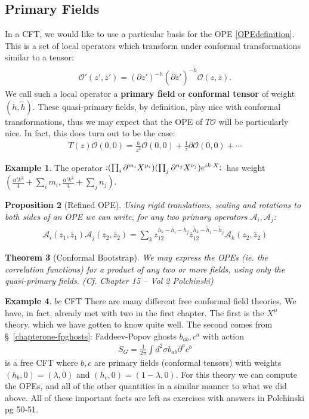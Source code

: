 \documentclass{report}
\theoremstyle{plain}
\newtheorem{theorem}{Theorem}[section]
\newtheorem{proposition}[theorem]{Proposition}
\theoremstyle{definition}
\newtheorem{example}[theorem]{Example}
\theoremstyle{remark}
\newcommand{\FR}[2]{\frac{#1}{#2}}
\newcommand{\ms}{\mathscr}
\newcommand{\lam}{\lambda}
\newcommand{\sg}{\sigma}
\newcommand{\di}{\partial}
\newcommand{\NO}[1]{\vcentcolon\mathrel{#1}\vcentcolon\,}
\begin{document}
\subsection{Primary Fields}
In a CFT, we would like to use a particular basis for the OPE
\eqref{OPEdefinition}. This is a set of local operators which transform
under conformal transformations similar to a tensor:
\begin{align}
    \ms O'(z',\bar z') = (\di z')^{-h}(\bar\di \bar z')^{-\tilde h} \ms
    O(z,\bar z).
    \label{primaryfielddefinition}
\end{align}
We call such a local operator a \textbf{primary field} or \textbf{conformal
tensor} of weight $(h,\tilde h)$. These quasi-primary fields, by
definition, play nice with conformal transformations, thus we may expect
that the OPE of $T\ms O$ will be particularly nice. In fact, this does turn
out to be the case:
\begin{align}
T(z)\ms O(0,0) = \FR{h}{z^2}\ms O(0,0) + \FR{1}{z}\di\ms O(0,0)+\cdots
\end{align}

\begin{example} The operator $\NO{(\prod_i\di^{m_i}X^{\mu_i})
(\prod_j\di^{n_j}X^{\nu_j})e^{ik\cdot X}}$ has weight $\left(
\FR{\alpha'k^2}{4} + \sum_i m_i, \FR{\alpha'k^2}{4} + \sum_j n_j \right)$.
\end{example}

\begin{proposition}[Refined OPE] Using rigid translations, scaling and
rotations to both sides of an OPE we can write, for any two primary
operators $\ms A_i, \ms A_j$:
\begin{align}
    \ms A_i(z_1,\bar z_1)\ms A_j(z_2,\bar z_2) = \sum_k
    z_{12}^{h_k-h_i-h_j}\bar z_{12}^{\tilde h_k-\tilde h_i-\tilde h_j}
    \ms A_k(z_2,\bar z_2)
    \label{refinedOPE}
\end{align}
\end{proposition}
\begin{theorem}[Conformal Bootstrap] 
    We may express the OPEs (ie. the correlation functions) for a product
    of any two or more fields, using only the quasi-primary fields. (Cf.
    Chapter 15 -- Vol 2 Polchinski)
\end{theorem}

\begin{example}{$bc$ CFT}
There are many different free conformal field theories. We have, in fact,
already met with two in the first chapter. The first is the $X^\mu$ theory,
which we have gotten to know quite well. The second comes from 
\S~\!\ref{chapterone-fpghosts}: Faddeev-Popov ghosts $b_{ab},c^a$ with
action \begin{align} S_G = \FR{1}{2\pi} \int d^2\sg b_{ab}\di^a c^b
\end{align} is a free CFT where $b,c$ are primary fields (conformal
tensors) with weights $(h_b,0) = (\lam,0)$ and $(h_c,0) = (1-\lam,0)$.
For this theory we can compute the OPEs, and all of the other quantities in
a similar manner to what we did above. All of these important facts are
left as exercises with answers in Polchinski pg 50-51.
\end{example}
\end{document}
